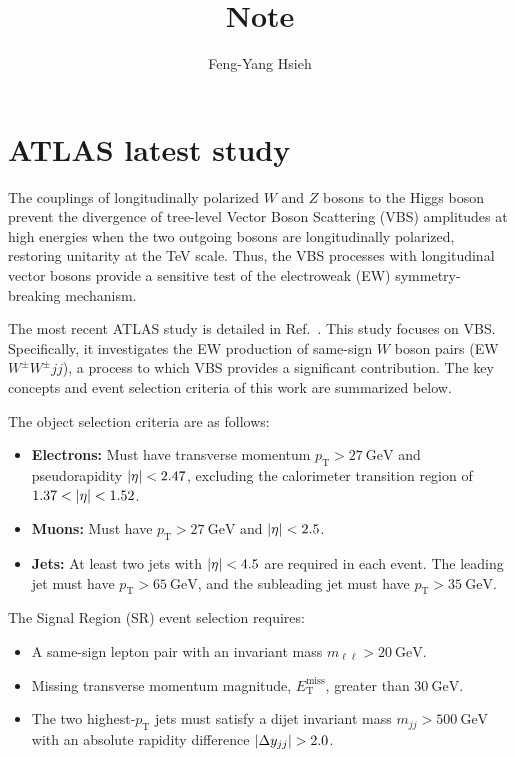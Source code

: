 \documentclass[12pt]{article}
\title{Note}
\author{Feng-Yang Hsieh}
\date{}
\begin{document}
\maketitle


\section{ATLAS latest study}%
\label{sec:atlas_latest_study}

    The couplings of longitudinally polarized $W$ and $Z$ bosons to the Higgs boson prevent the divergence of tree-level Vector Boson Scattering (VBS) amplitudes at high energies when the two outgoing bosons are longitudinally polarized, restoring unitarity at the TeV scale. Thus, the VBS processes with longitudinal vector bosons provide a sensitive test of the electroweak (EW) symmetry-breaking mechanism.

    The most recent ATLAS study is detailed in Ref.~\cite{ATLAS:2025wuw}. This study focuses on VBS. Specifically, it investigates the EW production of same-sign $W$ boson pairs (EW $W^{\pm} W^{\pm} jj$), a process to which VBS provides a significant contribution. The key concepts and event selection criteria of this work are summarized below.

    The object selection criteria are as follows:
    \begin{itemize}
        \item \textbf{Electrons:} Must have transverse momentum $p_{\text{T}} > 27~\mathrm{GeV}$ and pseudorapidity $\abs{\eta} < 2.47$, excluding the calorimeter transition region of $1.37 < \abs{\eta} < 1.52$.
        \item \textbf{Muons:} Must have $p_{\text{T}} > 27~\mathrm{GeV}$ and $\abs{\eta} < 2.5$.
        \item \textbf{Jets:} At least two jets with $\abs{\eta} < 4.5$ are required in each event. The leading jet must have $p_{\text{T}} > 65~\mathrm{GeV}$, and the subleading jet must have $p_{\text{T}} > 35~\mathrm{GeV}$.
    \end{itemize}

    The Signal Region (SR) event selection requires:
    \begin{itemize}
        \item A same-sign lepton pair with an invariant mass $m_{\ell\ell} > 20~\mathrm{GeV}$.
        \item Missing transverse momentum magnitude, $E_{\text{T}}^{\text{miss}}$, greater than $30~\mathrm{GeV}$.
        \item The two highest-$p_{\text{T}}$ jets must satisfy a dijet invariant mass $m_{jj} > 500~\mathrm{GeV}$ with an absolute rapidity difference $\abs{\Delta y_{jj}} > 2.0$.
    \end{itemize}
\end{document}
